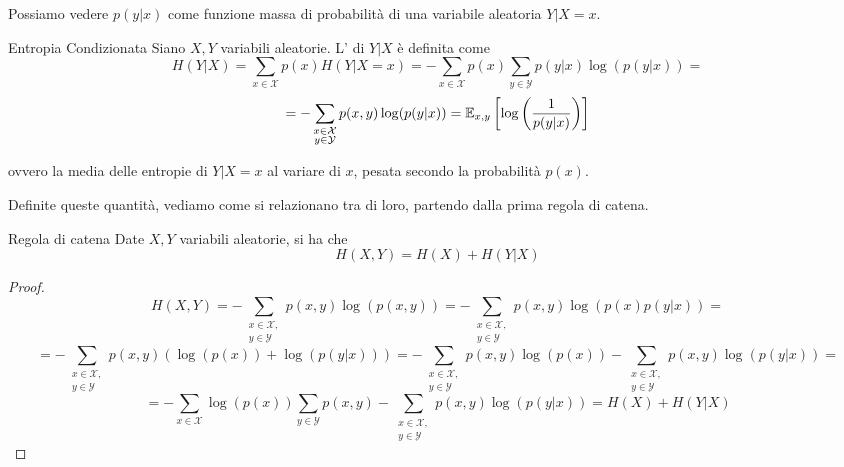 Possiamo vedere $p(y|x)$ come funzione massa di probabilità di una variabile aleatoria \(Y|X=x\).

\begin{definition}{Entropia Condizionata}
  Siano \(X,Y\) variabili aleatorie.
  L' di \(Y|X\) è definita come
  \[H(Y|X) = \sum_{x \in \mathcal{X}} p(x) H(Y|X=x) = - \sum_{x \in \mathcal{X}} p(x) \sum_{y \in \mathcal{Y}} p(y|x) \log(p(y|x)) = \]
  \[= -\sum_{\substack{x \in \mathcal{X}\\y \in \mathcal{Y}}} p(x,y) \log (p(y|x)) = \EV{\log\left(\frac{1}{p(y|x)}\right)}[x,y]\]
  
  ovvero la media delle entropie di \(Y|X=x\) al variare di \(x\), pesata secondo la probabilità \(p(x)\).
\end{definition}

Definite queste quantità, vediamo come si relazionano tra di loro, partendo dalla prima regola di catena.

\begin{proposition}{Regola di catena}
  Date \(X,Y\) variabili aleatorie, si ha che
  \[H(X,Y) = H(X) + H(Y|X)\]
\end{proposition}

\begin{proof}
  \[H(X,Y) =-\sum_{\substack{x \in \mathcal{X},\\ y \in \mathcal{Y}}} p(x,y) \log(p(x,y)) = -\sum_{\substack{x \in \mathcal{X},\\ y \in \mathcal{Y}}} p(x,y) \log(p(x)p(y|x)) = \]
  \[= - \sum_{\substack{x \in \mathcal{X},\\ y \in \mathcal{Y}}} p(x,y)\left(\log(p(x)) + \log(p(y|x))\right)  = - \sum_{\substack{x \in \mathcal{X},\\ y \in \mathcal{Y}}} p(x,y) \log(p(x)) - \sum_{\substack{x \in \mathcal{X},\\ y \in \mathcal{Y}}} p(x,y) \log(p(y|x)) =\]
  \[=- \sum_{x \in \mathcal{X}} \log(p(x))\sum_{y \in \mathcal{Y}} p(x,y)  - \sum_{\substack{x \in \mathcal{X},\\ y \in \mathcal{Y}}} p(x,y) \log(p(y|x)) = H(X) + H(Y|X)\]
\end{proof}

